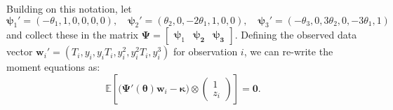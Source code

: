 Building on this notation, let
\begin{equation}
  \boldsymbol{\psi}_1' = (-\theta_1, 1, 0, 0, 0, 0), \quad
  \boldsymbol{\psi}_2' = (\theta_2, 0, -2\theta_1, 1, 0, 0), \quad
  \boldsymbol{\psi}_3' = (-\theta_3, 0, 3\theta_2, 0, -3\theta_1, 1)
  \label{eq:psi_def}
\end{equation}
and collect these in the matrix
$\boldsymbol{\Psi} = \left[
  \begin{array}{ccc}
    \boldsymbol{\psi}_1 & \boldsymbol{\psi_2} & \boldsymbol{\psi_3}
\end{array}\right]$.
Defining the observed data vector $\mathbf{w}_i' = (T_i, y_i, y_iT_i, y_i^2, y_i^2 T_i, y_i^3)$ for observation $i$, we can re-write the moment equations as:
\begin{equation}
\mathbb{E}\left[
  \big(\boldsymbol{\Psi}'(\boldsymbol{\theta})\mathbf{w}_i - \boldsymbol{\kappa}\big) \otimes 
\left(
\begin{array}{c}
  1 \\ z_i
\end{array}\right)
\right] = \mathbf{0}.
\label{eq:MCs_endog}
\end{equation}


